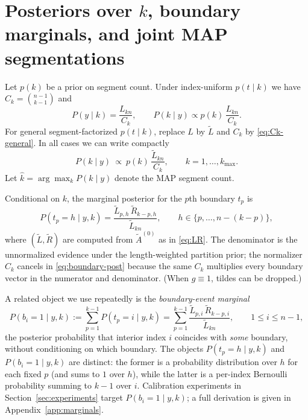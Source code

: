 \section[Posteriors over segment counts, boundary marginals, and joint MAP segmentations]{Posteriors over $k$, boundary marginals, and joint MAP segmentations}
Let $p(k)$ be a prior on segment count. Under index-uniform $p(t\mid k)$ we have
$C_k=\binom{n-1}{k-1}$ and
\[
P(y\mid k) = \frac{L_{k n}}{C_k},
\qquad
P(k\mid y)\propto p(k)\,\frac{L_{k n}}{C_k}.
\]
For general segment-factorized $p(t\mid k)$, replace $L$ by $\widetilde{L}$ and $C_k$ by
\eqref{eq:Ck-general}. In all cases we can write compactly
\begin{equation}
P(k\mid y)\ \propto\ p(k)\,\frac{\widetilde{L}_{k n}}{C_k},
\qquad k=1,\dots,k_{\max}.
\label{eq:post-k}
\end{equation}
Let $\widehat{k}=\arg\max_k P(k\mid y)$ denote the MAP segment count.

Conditional on $k$, the marginal posterior for the $p$th boundary $t_p$ is
\begin{equation}
P(t_p=h\mid y,k)
 = \frac{\widetilde{L}_{p,h}\,\widetilde{R}_{k-p,h}}{\widetilde{L}_{k n}},
\qquad
h\in\{p,\dots,n-(k-p)\},
\label{eq:boundary-post}
\end{equation}
where $(\widetilde{L},\widetilde{R})$ are computed from $\widetilde{A}^{(0)}$ as in
\eqref{eq:LR}. The denominator is the unnormalized evidence under the length-weighted partition
prior; the normalizer $C_k$ cancels in \eqref{eq:boundary-post} because the same $C_k$ multiplies
every boundary vector in the numerator and denominator. (When $g\equiv 1$, tildes can be dropped.)

\begin{remark}
\label{rem:boundary-event}
A related object we use repeatedly is the \emph{boundary-event marginal}
\begin{equation}
P(b_i=1\mid y,k)
 := \sum_{p=1}^{k-1} P(t_p=i\mid y,k)
 = \sum_{p=1}^{k-1}\frac{\widetilde{L}_{p,i}\,\widetilde{R}_{k-p,i}}{\widetilde{L}_{k n}},
 \qquad 1\le i\le n-1,
\label{eq:boundary-event}
\end{equation}
the posterior probability that interior index $i$ coincides with \emph{some} boundary, without
conditioning on which boundary. The objects $P(t_p=h\mid y,k)$ and $P(b_i=1\mid y,k)$ are
distinct: the former is a probability distribution over $h$ for each fixed $p$ (and sums to $1$ over
$h$), while the latter is a per-index Bernoulli probability summing to $k-1$ over $i$. Calibration
experiments in Section~\ref{sec:experiments} target $P(b_i=1\mid y,k)$; a full derivation is given
in Appendix~\ref{app:marginals}.
\end{remark}

